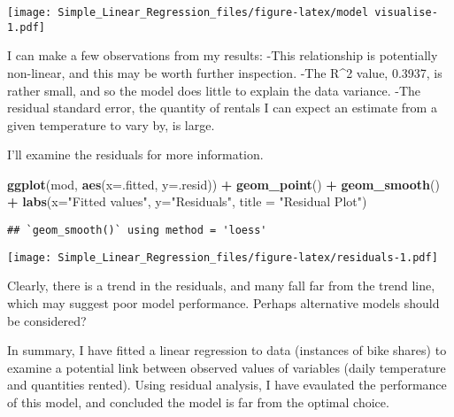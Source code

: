 \documentclass[]{article}
\newenvironment{Shaded}{\begin{snugshade}}{\end{snugshade}}
\newcommand{\KeywordTok}[1]{\textcolor[rgb]{0.13,0.29,0.53}{\textbf{#1}}}
\newcommand{\DataTypeTok}[1]{\textcolor[rgb]{0.13,0.29,0.53}{#1}}
\newcommand{\StringTok}[1]{\textcolor[rgb]{0.31,0.60,0.02}{#1}}
\newcommand{\OperatorTok}[1]{\textcolor[rgb]{0.81,0.36,0.00}{\textbf{#1}}}
\newcommand{\NormalTok}[1]{#1}
\begin{document}
\texttt{[image: Simple\_Linear\_Regression\_files/figure-latex/model visualise-1.pdf]}

I can make a few observations from my results: -This relationship is
potentially non-linear, and this may be worth further inspection. -The
R\^{}2 value, 0.3937, is rather small, and so the model does little to
explain the data variance. -The residual standard error, the quantity of
rentals I can expect an estimate from a given temperature to vary by, is
large.

I'll examine the residuals for more information.

\begin{Shaded}
\begin{Highlighting}[]
\KeywordTok{ggplot}\NormalTok{(mod, }\KeywordTok{aes}\NormalTok{(}\DataTypeTok{x=}\NormalTok{.fitted, }\DataTypeTok{y=}\NormalTok{.resid)) }\OperatorTok{+}\StringTok{ }
\StringTok{  }\KeywordTok{geom_point}\NormalTok{() }\OperatorTok{+}
\StringTok{  }\KeywordTok{geom_smooth}\NormalTok{() }\OperatorTok{+}
\StringTok{  }\KeywordTok{labs}\NormalTok{(}\DataTypeTok{x=}\StringTok{"Fitted values"}\NormalTok{, }\DataTypeTok{y=}\StringTok{"Residuals"}\NormalTok{, }\DataTypeTok{title =} \StringTok{"Residual Plot"}\NormalTok{)}
\end{Highlighting}
\end{Shaded}

\begin{verbatim}
## `geom_smooth()` using method = 'loess'
\end{verbatim}

\texttt{[image: Simple\_Linear\_Regression\_files/figure-latex/residuals-1.pdf]}

Clearly, there is a trend in the residuals, and many fall far from the
trend line, which may suggest poor model performance. Perhaps
alternative models should be considered?

In summary, I have fitted a linear regression to data (instances of bike
shares) to examine a potential link between observed values of variables
(daily temperature and quantities rented). Using residual analysis, I
have evaulated the performance of this model, and concluded the model is
far from the optimal choice.
\end{document}
